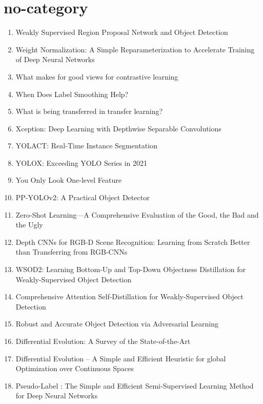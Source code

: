 \documentclass[acmlarge]{acmart}
\begin{document}
\section{no-category}
\begin{enumerate}
	\item Weakly Supervised Region Proposal Network and Object Detection \cite{Tang2018WeaklySR}
	\item Weight Normalization: A Simple Reparameterization to Accelerate Training of Deep Neural Networks \cite{Salimans2016WeightNA}
	\item What makes for good views for contrastive learning \cite{Tian2020WhatMF}
	\item When Does Label Smoothing Help? \cite{Mller2019WhenDL}
	\item What is being transferred in transfer learning? \cite{Neyshabur2020WhatIB}
	\item Xception: Deep Learning with Depthwise Separable Convolutions \cite{Chollet2017XceptionDL}
	\item YOLACT: Real-Time Instance Segmentation \cite{Bolya2019YOLACTRI}
	\item YOLOX: Exceeding YOLO Series in 2021 \cite{Ge2021YOLOXEY}
	\item You Only Look One-level Feature \cite{Chen2021YouOL}
	\item PP-YOLOv2: A Practical Object Detector \cite{Huang2021PPYOLOv2AP}
	\item Zero-Shot Learning—A Comprehensive Evaluation of the Good, the Bad and the Ugly \cite{Xian2019ZeroShotLC}
	\item Depth CNNs for RGB-D Scene Recognition: Learning from Scratch Better than Transferring from RGB-CNNs \cite{Song2017DepthCF}
	\item WSOD2: Learning Bottom-Up and Top-Down Objectness Distillation for Weakly-Supervised Object Detection \cite{Zeng2019WSOD2LB}
	\item Comprehensive Attention Self-Distillation for Weakly-Supervised Object Detection \cite{Huang2020ComprehensiveAS}
	\item Robust and Accurate Object Detection via Adversarial Learning \cite{Chen2021RobustAA}
	\item Differential Evolution: A Survey of the State-of-the-Art \cite{Das2011DifferentialEA}
	\item Differential Evolution – A Simple and Efficient Heuristic for global Optimization over Continuous Spaces \cite{Storn1997DifferentialE}
	\item Pseudo-Label : The Simple and Efficient Semi-Supervised Learning Method for Deep Neural Networks \cite{Lee2013PseudoLabelT}

\end{enumerate}
\end{document}
